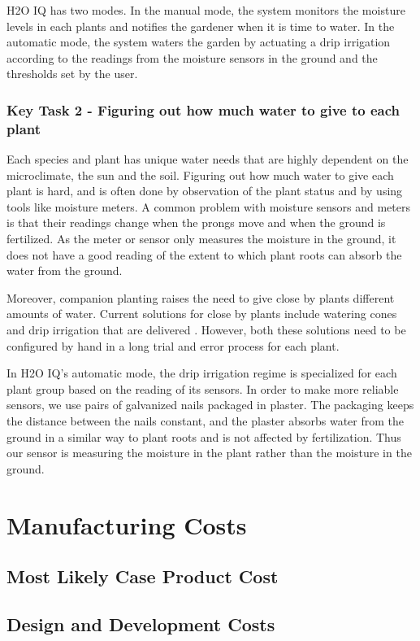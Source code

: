 \documentclass[11pt]{article}
\begin{document}
H2O IQ has two modes. In the manual mode, the system monitors the moisture levels in each plants and notifies the gardener when it is time to water. In the automatic mode, the system waters the garden by actuating a drip irrigation according to the readings from the moisture sensors in the ground and the thresholds set by the user.

\subsubsection{Key Task 2 - Figuring out how much water to give to each plant}

Each species and plant has unique water needs that are highly dependent on the microclimate, the sun and the soil. Figuring out how much water to give each plant is hard, and is often done by observation of the plant status and by using tools like moisture meters. A common problem with moisture sensors and meters is that their readings change when the prongs move and when the ground is fertilized. As the meter or sensor only measures the moisture in the ground, it does not have a good reading of the extent to which plant roots can absorb the water from the ground.

Moreover, companion planting raises the need to give close by plants different amounts of water. Current solutions for close by plants include watering cones and drip irrigation that are delivered . However, both these solutions need to be configured by hand in a long trial and error process for each plant.

In H2O IQ's automatic mode, the drip irrigation regime is specialized for each plant group based on the reading of its sensors. In order to make more reliable sensors, we use pairs of galvanized nails packaged in plaster. The packaging keeps the distance between the nails constant, and the plaster absorbs water from the ground in a similar way to plant roots and is not affected by fertilization. Thus our sensor is measuring the moisture in the plant rather than the moisture in the ground.

\section{Manufacturing Costs}

\subsection{Most Likely Case Product Cost}
\subsection{Design and Development Costs}
\end{document}
